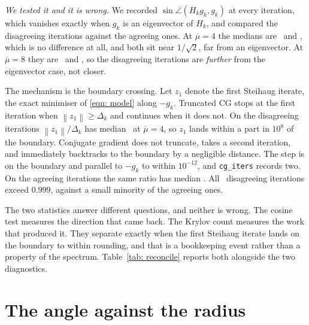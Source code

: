 \documentclass[11pt,a4paper]{article}
\providecommand{\norm}[1]{\left \lVert #1 \right \rVert}
\begin{document}
\emph{We tested it and it is wrong.} We recorded
$\sin\angle(H_kg_k, g_k)$ at every iteration, which vanishes exactly when $g_k$
is an eigenvector of $H_k$, and compared the disagreeing iterations against the
agreeing ones. At $\overline{\mu} = 4$ the medians are \SinDisFour\ and
\SinAgreeFour, which is no difference at all, and both sit near $1/\sqrt2$,
far from an eigenvector. At $\overline{\mu} = 8$ they are \SinDisEight\ and
\SinAgreeEight, so the disagreeing iterations are \emph{further} from the
eigenvector case, not closer.

The mechanism is the boundary crossing. Let $z_1$ denote the first Steihaug
iterate, the exact minimiser of \eqref{eqn: model} along $-g_k$. Truncated CG
stops at the first iteration when $\norm{z_1} \geq \Delta_k$ and continues when
it does not. On the disagreeing iterations $\norm{z_1}/\Delta_k$ has median
\ZDisFour\ at $\overline{\mu} = 4$, so $z_1$ lands within a part in $10^{8}$ of
the boundary. Conjugate gradient does not truncate, takes a second iteration,
and immediately backtracks to the boundary by a negligible distance. The step is
on the boundary and parallel to $-g_k$ to within $10^{-12}$, and
\texttt{cg\_iters} records two. On the agreeing iterations the same ratio has
median \ZAgreeFour. All \NDisFour\ disagreeing iterations exceed $0.999$, against
a small minority of the agreeing ones.

The two statistics answer different questions, and neither is wrong. The cosine
test measures the direction that came back. The Krylov count measures the work
that produced it. They separate exactly when the first Steihaug iterate lands on
the boundary to within rounding, and that is a bookkeeping event rather than a
property of the spectrum. Table~\ref{tab: reconcile} reports both alongside the
two diagnostics.

\begin{table}[H]\centering\small
  
  \caption{The two Cauchy statistics, with the near-eigenvector measure
  $\sin\angle(H_kg_k,g_k)$ and the boundary ratio $\norm{z_1}/\Delta_k$, medians
  over the disagreeing and agreeing iterations. Rows with no disagreement are
  omitted. Exact Hessian only, since $H_k$ is known in closed form there.}
  \label{tab: reconcile}
\end{table}

\section{The angle against the radius}\label{sec: angle}
\end{document}
